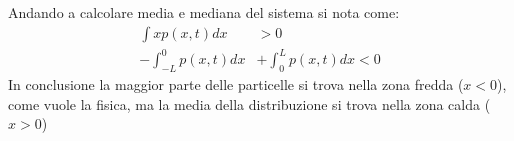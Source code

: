 \documentclass[12pt, a4paper]{article}
\theoremstyle{theorem}
\begin{document}
			Andando a calcolare media e mediana del sistema si nota come:
			\begin{equation}
				\begin{split}
					\int xp(x,t)dx&>0\\
					-\int_{-L}^0p(x,t)dx&+\int_0^Lp(x,t)dx<0
				\end{split}
			\end{equation}
			In conclusione la maggior parte delle particelle si trova nella zona fredda ($x<0$), come vuole la fisica, ma la media della distribuzione si trova nella zona calda ($x>0$)
			
			
\end{document}
